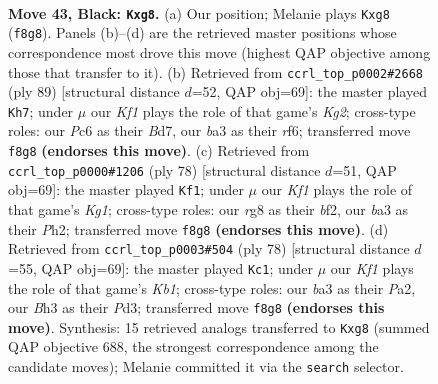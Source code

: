 \documentclass[11pt]{article}
\begin{document}
\clearpage

\begin{figure}[p]\centering
\begin{subfigure}{0.46\textwidth}\centering
\resizebox{\linewidth}{!}{%
\newchessgame
\chessboard[
  setfen={r4kR1/2R1b3/p1p5/8/8/B6b/8/1N2K3 b - - 0 43},
  showmover=false,
  pgfstyle=straightmove, color=movearrow, markmove={f8-g8}
]}
\caption{}
\end{subfigure}\hfill
\begin{subfigure}{0.46\textwidth}\centering
\resizebox{\linewidth}{!}{%
\newchessgame
\chessboard[
  setfen={8/3b2k1/5R1B/4Pp2/3Kp3/8/6r1/8 b - - 10 45},
  showmover=false,
  pgfstyle=straightmove, color=movearrow, markmove={g7-h7}
]}
\caption{}
\end{subfigure}
\\[4pt]
\begin{subfigure}{0.46\textwidth}\centering
\resizebox{\linewidth}{!}{%
\newchessgame
\chessboard[
  setfen={8/2B2k1p/8/6R1/P7/8/r4b1P/6K1 w - - 0 40},
  showmover=false,
  pgfstyle=straightmove, color=movearrow, markmove={g1-f1}
]}
\caption{}
\end{subfigure}\hfill
\begin{subfigure}{0.46\textwidth}\centering
\resizebox{\linewidth}{!}{%
\newchessgame
\chessboard[
  setfen={1k6/8/8/8/1p1bR3/1B1P4/Pr6/1K6 w - - 0 40},
  showmover=false,
  pgfstyle=straightmove, color=movearrow, markmove={b1-c1}
]}
\caption{}
\end{subfigure}
\caption{\textbf{Move 43, Black: \texttt{Kxg8}.} (a) Our position; Melanie plays \texttt{Kxg8} (\texttt{f8g8}). Panels (b)--(d) are the retrieved master positions whose correspondence most drove this move (highest QAP objective among those that transfer to it). (b) Retrieved from \texttt{ccrl\_top\_p0002\#2668} (ply 89) [structural distance $d$=52, QAP obj=69]: the master played \texttt{Kh7}; under $\mu$ our \emph{Kf1} plays the role of that game's \emph{Kg2}; cross-type roles: our \emph{P}c6 as their \emph{B}d7, our \emph{b}a3 as their \emph{r}f6; transferred move \texttt{f8g8} \textbf{(endorses this move)}. (c) Retrieved from \texttt{ccrl\_top\_p0000\#1206} (ply 78) [structural distance $d$=51, QAP obj=69]: the master played \texttt{Kf1}; under $\mu$ our \emph{Kf1} plays the role of that game's \emph{Kg1}; cross-type roles: our \emph{r}g8 as their \emph{b}f2, our \emph{b}a3 as their \emph{P}h2; transferred move \texttt{f8g8} \textbf{(endorses this move)}. (d) Retrieved from \texttt{ccrl\_top\_p0003\#504} (ply 78) [structural distance $d$=55, QAP obj=69]: the master played \texttt{Kc1}; under $\mu$ our \emph{Kf1} plays the role of that game's \emph{Kb1}; cross-type roles: our \emph{b}a3 as their \emph{P}a2, our \emph{B}h3 as their \emph{P}d3; transferred move \texttt{f8g8} \textbf{(endorses this move)}. Synthesis: 15 retrieved analogs transferred to \texttt{Kxg8} (summed QAP objective 688, the strongest correspondence among the candidate moves); Melanie committed it via the \texttt{search} selector.}
\label{fig:thought-m85}
\end{figure}
\end{document}
